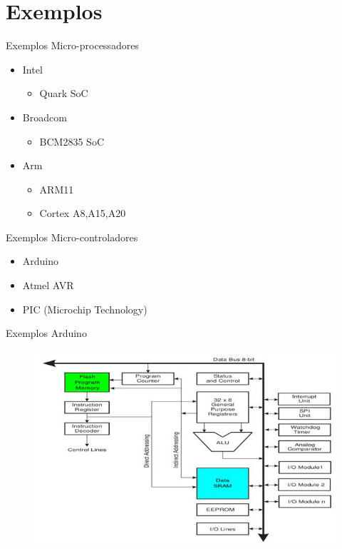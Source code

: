 \documentclass[t]{beamer}
\begin{document}
\section{Exemplos}

\begin{frame}{Exemplos}
Micro-processadores
\begin{itemize}
\item Intel
\begin{itemize}
\item Quark SoC
\end{itemize}
\item Broadcom
\begin{itemize}
\item BCM2835 SoC
\end{itemize}
\item Arm
\begin{itemize}
\item ARM11
\item Cortex A8,A15,A20
\end{itemize}
\end{itemize}
\end{frame}

\begin{frame}{Exemplos}
Micro-controladores
\begin{itemize}
\item Arduino
\item Atmel AVR
\item PIC (Microchip Technology)
\end{itemize}
\end{frame}

\begin{frame}{Exemplos}
Arduino
\begin{figure}
\includegraphics[width=\linewidth]{Arduino-Architecture}
\end{figure}
\end{frame}
\end{document}
